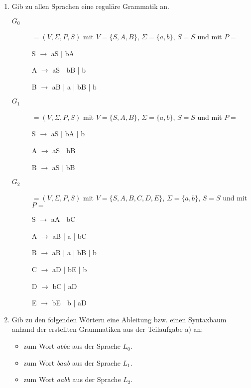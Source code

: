 \documentclass{lehramt-informatik-aufgabe}
\begin{document}
\begin{enumerate}


\item Gib zu allen Sprachen eine reguläre Grammatik an.

\begin{liAntwort}

\begin{description}
%

\item[$G_0$]

$= (V, \Sigma, P, S)$ mit
$V = \{S, A, B\}$,
$\Sigma = \{a, b\}$,
$S = S$ und mit $P =$

S $\rightarrow$ aS | bA

A $\rightarrow$ aS | bB | b

B $\rightarrow$ aB | a | bB | b

%

\item[$G_1$]

$= (V, \Sigma, P, S)$ mit
$V = \{S, A, B\}$,
$\Sigma = \{a, b\}$,
$S = S$ und mit $P =$

S $\rightarrow$ aS | bA | b

A $\rightarrow$ aS | bB

B $\rightarrow$ aS | bB

%

\item[$G_2$]

$= (V, \Sigma, P, S)$ mit
$V = \{S, A, B, C, D, E\}$,
$\Sigma = \{a, b\}$, $S = S$ und mit
$P =$

S $\rightarrow$ aA | bC

A $\rightarrow$ aB | a | bC

B $\rightarrow$ aB | a | bB | b

C $\rightarrow$ aD | bE | b

D $\rightarrow$ bC | aD

E $\rightarrow$ bE | b | aD

\end{description}
\end{liAntwort}


\item Gib zu den folgenden Wörtern eine Ableitung bzw. einen Syntaxbaum
anhand der erstellten Grammatiken aus der Teilaufgabe a) an:

\begin{itemize}
\item zum Wort \emph{abba} aus der Sprache $L_0$.
\item zum Wort \emph{baab} aus der Sprache $L_1$.
\item zum Wort \emph{aabb} aus der Sprache $L_2$.
\end{itemize}


\end{enumerate}
\end{document}
